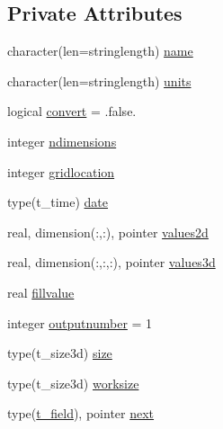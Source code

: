 \subsection*{Private Attributes}
\begin{DoxyCompactItemize}
\item 
character(len=stringlength) \mbox{\hyperlink{structmodulecfpolcomformat_1_1t__field_ab31cfc76e80bb5be320db12a78541aec}{name}}
\item 
character(len=stringlength) \mbox{\hyperlink{structmodulecfpolcomformat_1_1t__field_a9f677246eabbf7e2b991aa694f92468c}{units}}
\item 
logical \mbox{\hyperlink{structmodulecfpolcomformat_1_1t__field_a55eead7a0c5679da1d2b9e145735588b}{convert}} = .false.
\item 
integer \mbox{\hyperlink{structmodulecfpolcomformat_1_1t__field_a359a98611acf58f9fa581a01b2573070}{ndimensions}}
\item 
integer \mbox{\hyperlink{structmodulecfpolcomformat_1_1t__field_a91295a90575e5ed67416b56ebb4c75a7}{gridlocation}}
\item 
type(t\+\_\+time) \mbox{\hyperlink{structmodulecfpolcomformat_1_1t__field_aefd8eb9c6059549755b6e6aa6742048b}{date}}
\item 
real, dimension(\+:,\+:), pointer \mbox{\hyperlink{structmodulecfpolcomformat_1_1t__field_a9d32f005e39d4084aaf96e57428a8e1a}{values2d}}
\item 
real, dimension(\+:,\+:,\+:), pointer \mbox{\hyperlink{structmodulecfpolcomformat_1_1t__field_a8f93352dd274b4348fe21082733c8ba9}{values3d}}
\item 
real \mbox{\hyperlink{structmodulecfpolcomformat_1_1t__field_a128792683daa7263ed1d40bcecccf06b}{fillvalue}}
\item 
integer \mbox{\hyperlink{structmodulecfpolcomformat_1_1t__field_a298b4b5dd2b21bee45e6488b3f699db9}{outputnumber}} = 1
\item 
type(t\+\_\+size3d) \mbox{\hyperlink{structmodulecfpolcomformat_1_1t__field_a0957a311e89dce7ecbdd963af64f6e50}{size}}
\item 
type(t\+\_\+size3d) \mbox{\hyperlink{structmodulecfpolcomformat_1_1t__field_aa5914a92f441796d7ce2c111cff0e2bf}{worksize}}
\item 
type(\mbox{\hyperlink{structmodulecfpolcomformat_1_1t__field}{t\+\_\+field}}), pointer \mbox{\hyperlink{structmodulecfpolcomformat_1_1t__field_a60e29ea13d5b8875b54b8ab339bd2dd0}{next}}
\end{DoxyCompactItemize}


